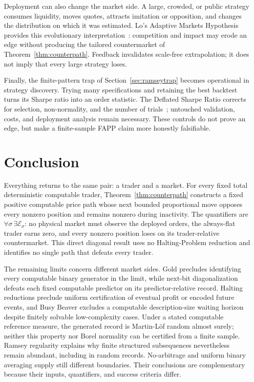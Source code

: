 \documentclass[aps,pra,reprint,superscriptaddress,amsmath,amssymb,floatfix]{revtex4-2}
\theoremstyle{plain}
\theoremstyle{definition}
\theoremstyle{remark}
\begin{document}
Deployment can also change the market side. A large, crowded, or public
strategy consumes liquidity, moves quotes, attracts imitation or opposition,
and changes the distribution on which it was estimated. Lo's Adaptive Markets
Hypothesis provides this evolutionary interpretation~\cite{Lo2004}: competition
and impact may erode an edge without producing the tailored countermarket of
Theorem~\ref{thm:counterpath}. Feedback invalidates scale-free extrapolation; it
does not imply that every large strategy loses.

Finally, the finite-pattern trap of Section~\ref{sec:ramseytrap} becomes
operational in strategy discovery. Trying many specifications and retaining the
best backtest turns its Sharpe ratio into an order statistic. The Deflated
Sharpe Ratio corrects for selection, non-normality, and the number of
trials~\cite{BaileyLopez2014}; untouched validation, costs, and deployment
analysis remain necessary. These controls do not prove an edge, but make a
finite-sample FAPP claim more honestly falsifiable.

\section{Conclusion}
\label{sec:conclusion}

Everything returns to the same pair: a trader and a market. For every fixed
total deterministic computable trader, Theorem~\ref{thm:counterpath} constructs
a fixed positive computable price path whose next bounded proportional move
opposes every nonzero position and remains nonzero during inactivity.
The quantifiers are
\(\forall\sigma\,\exists\mathcal E_\sigma\): no physical market must observe
the deployed orders, the always-flat trader earns zero, and every nonzero
position loses on its trader-relative countermarket. This direct diagonal
result uses no Halting-Problem reduction and identifies no single path that
defeats every trader.

The remaining limits concern different market sides. Gold precludes identifying
every computable binary generator in the limit, while next-bit diagonalization
defeats each fixed computable predictor on its predictor-relative record.
Halting reductions preclude uniform certification of eventual profit or encoded
future events, and Busy Beaver excludes a computable description-size waiting
horizon despite finitely solvable low-complexity cases. Under a stated
computable reference measure, the generated record is Martin-L\"of random
almost surely; neither this property nor Borel normality can be certified
from a finite sample. Ramsey regularity explains why finite
structured subsequences nevertheless remain abundant, including in random
records. No-arbitrage and uniform binary averaging supply still different
boundaries. Their conclusions are complementary because their inputs,
quantifiers, and success criteria differ.
\end{document}
